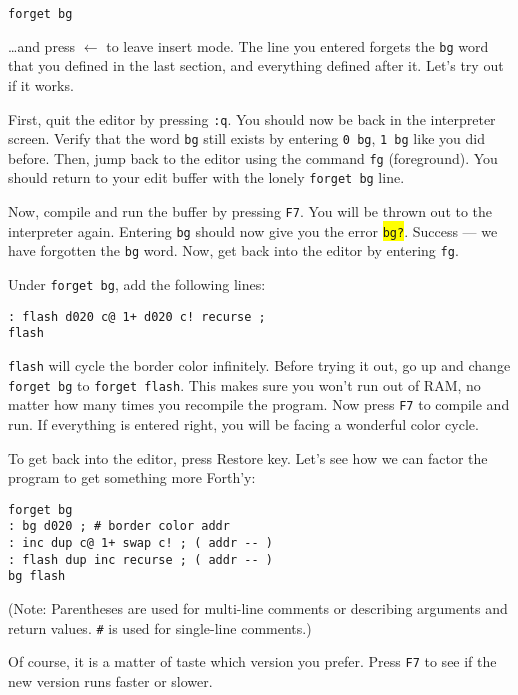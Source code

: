 \begin{verbatim}
forget bg
\end{verbatim}

\ldots and press $\leftarrow$ to leave insert mode. The line you entered forgets the \texttt{bg} word that you defined in the last section, and everything defined after it. Let's try out if it works.

First, quit the editor by pressing \texttt{:q}. You should now be back in the interpreter screen. Verify that the word \texttt{bg} still exists by  entering \texttt{0 bg}, \texttt{1 bg} like you did before. Then, jump back to the editor using the command \texttt{fg} (foreground). You should return to your edit buffer with the lonely \texttt{forget bg} line.

Now, compile and run the buffer by pressing \texttt{F7}. You will be thrown out to the interpreter
again. Entering \texttt{bg} should now give you the error \colorbox{yellow}{\texttt{bg?}}. Success
--- we have forgotten the \texttt{bg} word. Now, get back into the editor by entering \texttt{fg}.

Under \texttt{forget bg}, add the following lines:

\begin{verbatim}
: flash d020 c@ 1+ d020 c! recurse ;
flash
\end{verbatim}

\texttt{flash} will cycle the border color infinitely. Before trying it out, go up and change \texttt{forget bg} to \texttt{forget flash}. This makes sure you won't run out of RAM, no matter how many times you recompile the program. Now press \texttt{F7} to compile and run. If everything is entered right, you will be facing a wonderful color cycle.

To get back into the editor, press Restore key. Let's see how we can factor the program to get something more Forth'y:

\begin{verbatim}
forget bg
: bg d020 ; # border color addr
: inc dup c@ 1+ swap c! ; ( addr -- )
: flash dup inc recurse ; ( addr -- )
bg flash
\end{verbatim}

(Note: Parentheses are used for multi-line comments or describing arguments and return values. \texttt{\#} is used for single-line comments.)

Of course, it is a matter of taste which version you prefer. Press \texttt{F7} to see if the new version runs faster or slower.

